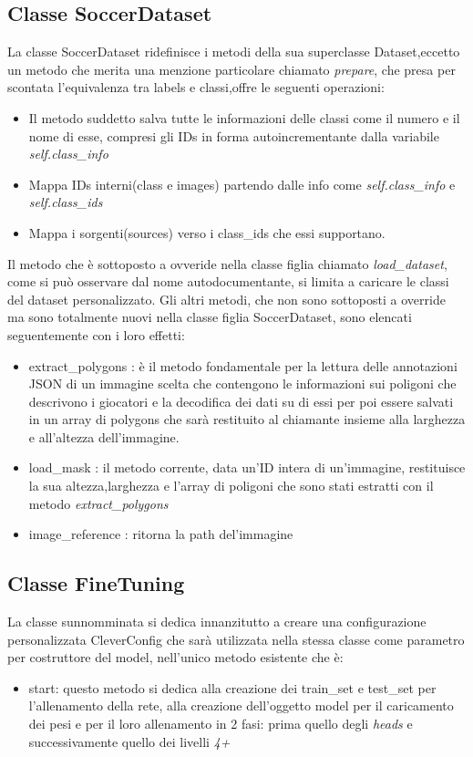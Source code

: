 \subsection*{Classe SoccerDataset}
La classe SoccerDataset ridefinisce i metodi della sua superclasse Dataset,eccetto un metodo che merita una menzione particolare chiamato \emph{prepare}, che presa per scontata l'equivalenza tra labels e classi,offre le seguenti operazioni:
\begin{itemize}
\item Il metodo suddetto  salva tutte le informazioni delle classi come il numero e il nome di esse, compresi gli IDs in forma autoincrementante dalla variabile \emph{self.class\_info}
\item Mappa IDs interni(class e images) partendo dalle info come \emph{self.class\_info} e \emph{self.class\_ids}
\item Mappa i sorgenti(sources) verso i class\_ids che essi supportano.
\end{itemize}
Il metodo che è sottoposto a ovveride nella classe figlia chiamato \emph{load\_dataset}, come si può osservare dal nome autodocumentante, si limita a caricare le classi del dataset personalizzato.
Gli altri metodi, che non sono sottoposti a override ma sono totalmente nuovi nella classe figlia SoccerDataset, sono elencati seguentemente con i loro effetti:
\begin{itemize}
\item extract\_polygons : è il metodo fondamentale per la lettura delle annotazioni JSON di un immagine scelta che contengono le informazioni sui poligoni che descrivono i giocatori e la decodifica dei dati su di essi per poi essere salvati in un array di polygons che sarà restituito al chiamante insieme alla larghezza e all'altezza dell'immagine.
\item load\_mask : il metodo corrente, data un'ID intera di un'immagine, restituisce la sua altezza,larghezza e l'array di poligoni che sono stati estratti con il metodo \emph{extract\_polygons}
\item image\_reference : ritorna la path del'immagine 
\end{itemize}

\subsection*{Classe FineTuning}
La classe sunnomminata si dedica innanzitutto a creare una configurazione personalizzata CleverConfig che sarà utilizzata nella stessa classe come parametro per costruttore del model, nell'unico metodo esistente che è:
\begin{itemize}
\item start: questo metodo si dedica alla creazione dei train\_set e test\_set per l'allenamento della rete, alla creazione dell'oggetto model per il caricamento dei pesi e per il loro allenamento in 2 fasi: prima quello degli \emph{heads} e successivamente quello dei livelli \emph{4+}
\end{itemize}
